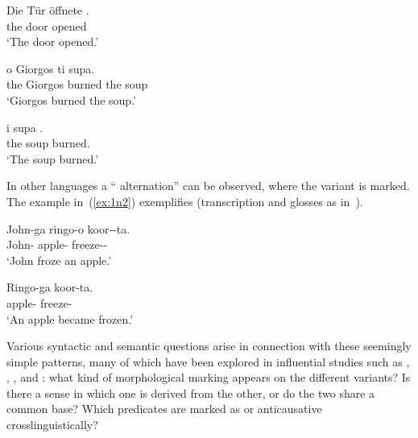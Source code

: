 \begin{exe}
\begin{xlist}
\begin{exe}
\begin{exe}
\begin{exe}
\begin{exe}
\begin{xlist}
\begin{exe}
\begin{xlist}
\begin{xlist}
 	\ex   
 		\gll Die T\"ur \"offnete .\\
		 the door opened \\ 
 		\glt `The door opened.' 
	
 \z

 \ex {} \label{ex:intro3} 
 \begin{xlist} 
 	\ex   
 		\gll o Giorgos  ti supa.\\
		 the Giorgos burned the soup\\ 
 		\glt `Giorgos burned the soup.' 
	
 	\ex   
 		\gll i supa .\\
		 the soup burned.\\ 
 		\glt `The soup burned.' 
	
 \z
\z 

In other languages a `` alternation'' can be observed, where the  variant is marked. The  example in~(\ref{ex:1n2}) exemplifies (transcription and glosses as in~\citealt[3]{oseki17nyu}).
 \begin{exe}
 \ex  {} \label{ex:1n2}
 \begin{xlist} 
 	\ex   
 		\gll John-ga ringo-o koor--ta.\\
		 John- apple- freeze--\\ 
 		\glt `John froze an apple.' 
	
 	\ex   
 		\gll Ringo-ga koor-ta.\\
		 apple- freeze-\\ 
 		\glt `An apple became frozen.' 
	
 \z
\z 

Various syntactic and semantic questions arise in connection with these seemingly simple patterns, many of which have been explored in influential studies such as \cite{haspelmath93}, \cite{unaccusativity95}, \cite{schaefer08}, \cite{koontzgarboden09} and \cite{layering15}: what kind of morphological marking appears on the different variants? Is there a sense in which one is derived from the other, or do the two share a common base? Which predicates are marked as  or anticausative crosslinguistically? 


\end{xlist}
\end{exe}
\end{xlist}
\end{xlist}
\end{xlist}
\end{exe}
\end{xlist}
\end{exe}
\end{exe}
\end{exe}
\end{exe}
\end{xlist}
\end{exe}
